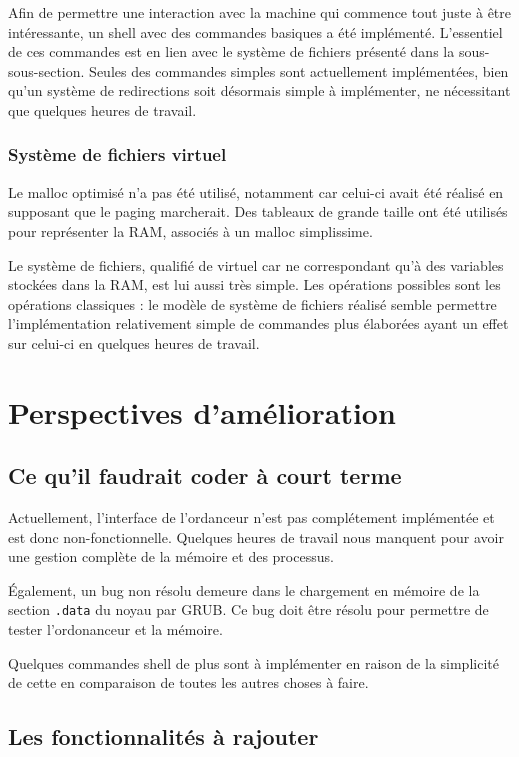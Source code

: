 \documentclass[a4paper, 11pt, twoside]{article}
\begin{document}
Afin de permettre une interaction avec la machine qui commence tout juste à être intéressante, 
un shell avec des commandes basiques a été implémenté. L'essentiel de ces commandes est en lien 
avec le système de fichiers présenté dans la sous-sous-section.
Seules des commandes simples sont actuellement implémentées, bien qu'un système de redirections 
soit désormais simple à implémenter, ne nécessitant que quelques heures de travail.

\subsubsection{Système de fichiers virtuel}

Le malloc optimisé n'a pas été utilisé, notamment car celui-ci avait été réalisé en supposant
que le paging marcherait. Des tableaux de grande taille ont été utilisés pour représenter
la RAM, associés à un malloc simplissime.

Le système de fichiers, qualifié de virtuel car ne correspondant qu'à des variables stockées
dans la RAM, est lui aussi très simple.
Les opérations possibles sont les opérations classiques : le modèle de système de fichiers
réalisé semble permettre l'implémentation relativement simple de commandes plus élaborées ayant
un effet sur celui-ci en quelques heures de travail.

\section{Perspectives d'amélioration}

\subsection{Ce qu'il faudrait coder à court terme}

Actuellement, l'interface de l'ordanceur n'est pas complétement implémentée et
est donc non-fonctionnelle. Quelques heures de travail nous manquent pour avoir
une gestion complète de la mémoire et des processus.

Également, un bug non résolu demeure dans le chargement en mémoire de la section
\texttt{.data} du noyau par GRUB. Ce bug doit être résolu pour permettre de
tester l'ordonanceur et la mémoire.

Quelques commandes shell de plus sont à implémenter en raison de la simplicité de cette
en comparaison de toutes les autres choses à faire.

\subsection{Les fonctionnalités à rajouter}
\end{document}
